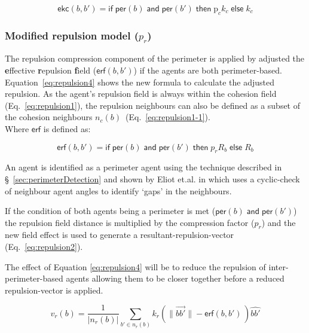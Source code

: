 \documentclass[12pt,a4paper]{IEEEtran}
\begin{document}
\small
\begin{equation}\label{eq:cohesion4}
\mathsf{ekc}(b, b') = \mathsf{if} \; \mathsf{per}(b) \; \mathsf{and} \; \mathsf{per}(b') \; \mathsf{then} \; \mathrm{p}_ck_c \; \mathsf{else} \; k_c
\end{equation}
\normalsize

\subsubsection{Modified repulsion model ($p_r$)}\label{repulsion:compression}
The repulsion compression component of the perimeter is applied by adjusted the \textbf{e}ffective \textbf{r}epulsion \textbf{f}ield ($\mathsf{erf}(b,b')$) if the agents are both perimeter-based. Equation~\ref{eq:repulsion4} shows the new formula to calculate the adjusted repulsion. As the agent's repulsion field is always within the cohesion field (Eq.~\ref{eq:repulsion1}), the repulsion neighbours can also be defined as a subset of the cohesion neighbours $n_c(b)$~(Eq.~\ref{eq:repulsion1-1}).\\



Where $\mathsf{erf}$ is defined as:

\small\begin{equation}\label{eq:repulsion2}
\mathsf{erf}(b, b') = \mathsf{if} \;
\mathsf{per}(b) \; \mathsf{and} \; \mathsf{per}(b') \; \mathsf{then} \;
p_rR_b \; \mathsf{else} \; R_b
\end{equation}\normalsize

An agent is identified as a perimeter agent using the technique described in \S~\ref{sec:perimeterDetection} and shown by Eliot et.al. in \cite{eliot2019void} which uses a cyclic-check of neighbour agent angles to identify `gaps' in the neighbours.

If the condition of both agents being a perimeter is met ($\mathsf{per}(b) \; \mathsf{and} \; \mathsf{per}(b')$) the repulsion field distance is multiplied by the compression factor ($p_r$) and the new field effect is used to generate a resultant-repulsion-vector (Eq.~\ref{eq:repulsion2}). 

The effect of Equation \ref{eq:repulsion4} will be to reduce the repulsion of inter-perimeter-based agents allowing them to be closer together before a reduced repulsion-vector is applied. 

\small
\begin{equation}\label{eq:repulsion4}
v_r(b) = \frac{1}{\lvert n_r(b)\rvert}\sum_{b' \in n_r(b)} k_r\left(\lVert\vec{bb'}\rVert - \mathsf{erf}(b,b') \, \right)\widehat{bb'}
\end{equation}
\normalsize
\end{document}
